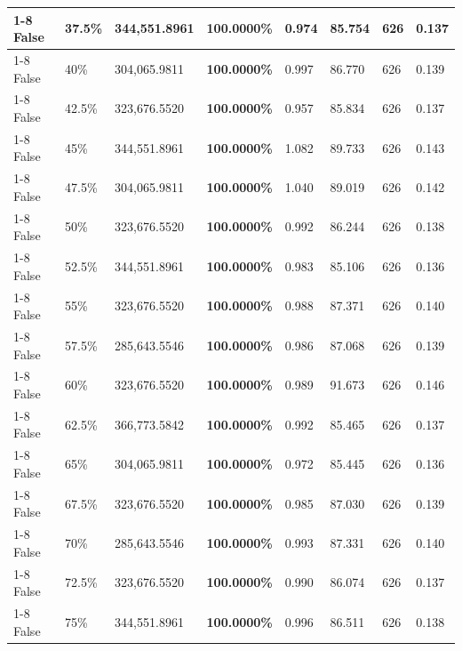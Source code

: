 \begin{table}[H]
\begin{tabular}{lllrllll}
\cline{1-8} \cline{2-8}
False & 37.5\% & 344,551.8961 & \bfseries \color{red} 100.0000\% & 0.974 & 85.754 & 626 & 0.137 \\
\cline{1-8} \cline{2-8}
False & 40\% & 304,065.9811 & \bfseries \color{red} 100.0000\% & 0.997 & 86.770 & 626 & 0.139 \\
\cline{1-8} \cline{2-8}
False & 42.5\% & 323,676.5520 & \bfseries \color{red} 100.0000\% & 0.957 & 85.834 & 626 & 0.137 \\
\cline{1-8} \cline{2-8}
False & 45\% & 344,551.8961 & \bfseries \color{red} 100.0000\% & 1.082 & 89.733 & 626 & 0.143 \\
\cline{1-8} \cline{2-8}
False & 47.5\% & 304,065.9811 & \bfseries \color{red} 100.0000\% & 1.040 & 89.019 & 626 & 0.142 \\
\cline{1-8} \cline{2-8}
False & 50\% & 323,676.5520 & \bfseries \color{red} 100.0000\% & 0.992 & 86.244 & 626 & 0.138 \\
\cline{1-8} \cline{2-8}
False & 52.5\% & 344,551.8961 & \bfseries \color{red} 100.0000\% & 0.983 & 85.106 & 626 & 0.136 \\
\cline{1-8} \cline{2-8}
False & 55\% & 323,676.5520 & \bfseries \color{red} 100.0000\% & 0.988 & 87.371 & 626 & 0.140 \\
\cline{1-8} \cline{2-8}
False & 57.5\% & \color{red} 285,643.5546 & \bfseries \color{red} 100.0000\% & 0.986 & 87.068 & 626 & 0.139 \\
\cline{1-8} \cline{2-8}
False & 60\% & 323,676.5520 & \bfseries \color{red} 100.0000\% & 0.989 & 91.673 & 626 & 0.146 \\
\cline{1-8} \cline{2-8}
False & 62.5\% & 366,773.5842 & \bfseries \color{red} 100.0000\% & 0.992 & 85.465 & 626 & 0.137 \\
\cline{1-8} \cline{2-8}
False & 65\% & 304,065.9811 & \bfseries \color{red} 100.0000\% & 0.972 & 85.445 & 626 & 0.136 \\
\cline{1-8} \cline{2-8}
False & 67.5\% & 323,676.5520 & \bfseries \color{red} 100.0000\% & 0.985 & 87.030 & 626 & 0.139 \\
\cline{1-8} \cline{2-8}
False & 70\% & \color{red} 285,643.5546 & \bfseries \color{red} 100.0000\% & 0.993 & 87.331 & 626 & 0.140 \\
\cline{1-8} \cline{2-8}
False & 72.5\% & 323,676.5520 & \bfseries \color{red} 100.0000\% & 0.990 & 86.074 & 626 & 0.137 \\
\cline{1-8} \cline{2-8}
False & 75\% & 344,551.8961 & \bfseries \color{red} 100.0000\% & 0.996 & 86.511 & 626 & 0.138 \\

\end{tabular}
\end{table}
